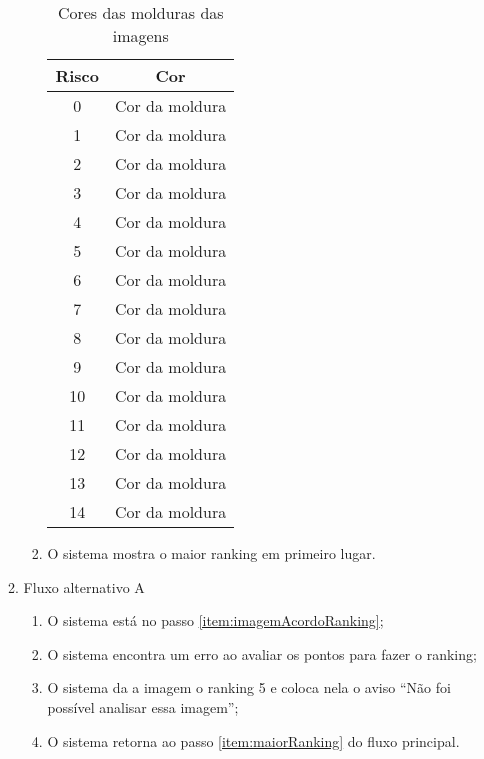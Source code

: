 \begin{itemize}
\begin{enumerate}
\begin{enumerate}
						\begin{table}[]
							\centering
							\caption{Cores das molduras das imagens}
								\begin{tabular}{|c|c|}
								\hline
									Risco & Cor \\ \hline
									0 & {\color[HTML]{000000} Cor da moldura} \\ \hline
									1 & {\color[HTML]{9ACD32} Cor da moldura} \\ \hline
									2 & {\color[HTML]{FFFACD} Cor da moldura} \\ \hline
									3 & {\color[HTML]{EEE8AA} Cor da moldura} \\ \hline
									4 & {\color[HTML]{BDB76B} Cor da moldura} \\ \hline
									5 & {\color[HTML]{DAA520} Cor da moldura} \\ \hline
									6 & {\color[HTML]{FFA07A} Cor da moldura} \\ \hline
									7 & {\color[HTML]{A0522D} Cor da moldura} \\ \hline
									8 & {\color[HTML]{CD5C5C} Cor da moldura} \\ \hline
									9 & {\color[HTML]{CD3333} Cor da moldura} \\ \hline
									10 & {\color[HTML]{B22222} Cor da moldura} \\ \hline
									11 & {\color[HTML]{EE3B3B} Cor da moldura} \\ \hline
									12 & {\color[HTML]{FF3030} Cor da moldura} \\ \hline
									13 & {\color[HTML]{FF4500} Cor da moldura} \\ \hline
									14 & {\color[HTML]{FF0000} Cor da moldura} \\ \hline
								\end{tabular}
								\label{tab:coresRisco}
						\end{table}

						\item O sistema mostra o maior ranking em primeiro lugar.
						\label{item:maiorRanking}
					\end{enumerate}

				\item Fluxo alternativo A
					\begin{enumerate}
						\item O sistema está no passo \ref{item:imagemAcordoRanking};
						\item O sistema encontra um erro ao avaliar os pontos para fazer o ranking;
						\item O sistema da a imagem o ranking 5 e coloca nela o aviso ``Não foi possível analisar essa imagem'';
						\item O sistema retorna ao passo \ref{item:maiorRanking} do fluxo principal.
					\end{enumerate}
			\end{enumerate}


\end{itemize}
